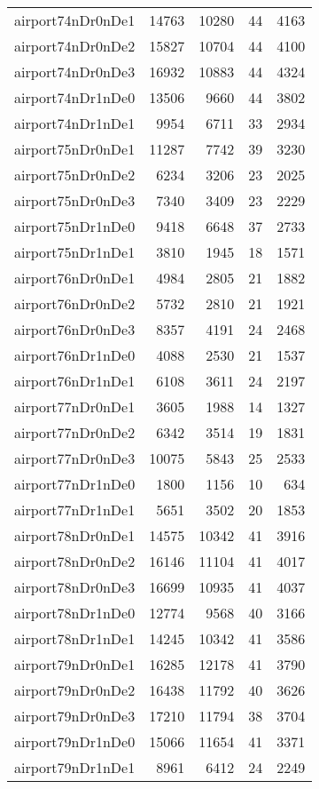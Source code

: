 \begin{longtable}{lrrrr}
airport74nDr0nDe1 & 14763 & 10280 & 44 & 4163 \\
airport74nDr0nDe2 & 15827 & 10704 & 44 & 4100 \\
airport74nDr0nDe3 & 16932 & 10883 & 44 & 4324 \\
airport74nDr1nDe0 & 13506 & 9660 & 44 & 3802 \\
airport74nDr1nDe1 & 9954 & 6711 & 33 & 2934 \\
airport75nDr0nDe1 & 11287 & 7742 & 39 & 3230 \\
airport75nDr0nDe2 & 6234 & 3206 & 23 & 2025 \\
airport75nDr0nDe3 & 7340 & 3409 & 23 & 2229 \\
airport75nDr1nDe0 & 9418 & 6648 & 37 & 2733 \\
airport75nDr1nDe1 & 3810 & 1945 & 18 & 1571 \\
airport76nDr0nDe1 & 4984 & 2805 & 21 & 1882 \\
airport76nDr0nDe2 & 5732 & 2810 & 21 & 1921 \\
airport76nDr0nDe3 & 8357 & 4191 & 24 & 2468 \\
airport76nDr1nDe0 & 4088 & 2530 & 21 & 1537 \\
airport76nDr1nDe1 & 6108 & 3611 & 24 & 2197 \\
airport77nDr0nDe1 & 3605 & 1988 & 14 & 1327 \\
airport77nDr0nDe2 & 6342 & 3514 & 19 & 1831 \\
airport77nDr0nDe3 & 10075 & 5843 & 25 & 2533 \\
airport77nDr1nDe0 & 1800 & 1156 & 10 & 634 \\
airport77nDr1nDe1 & 5651 & 3502 & 20 & 1853 \\
airport78nDr0nDe1 & 14575 & 10342 & 41 & 3916 \\
airport78nDr0nDe2 & 16146 & 11104 & 41 & 4017 \\
airport78nDr0nDe3 & 16699 & 10935 & 41 & 4037 \\
airport78nDr1nDe0 & 12774 & 9568 & 40 & 3166 \\
airport78nDr1nDe1 & 14245 & 10342 & 41 & 3586 \\
airport79nDr0nDe1 & 16285 & 12178 & 41 & 3790 \\
airport79nDr0nDe2 & 16438 & 11792 & 40 & 3626 \\
airport79nDr0nDe3 & 17210 & 11794 & 38 & 3704 \\
airport79nDr1nDe0 & 15066 & 11654 & 41 & 3371 \\
airport79nDr1nDe1 & 8961 & 6412 & 24 & 2249 \\

\end{longtable}
